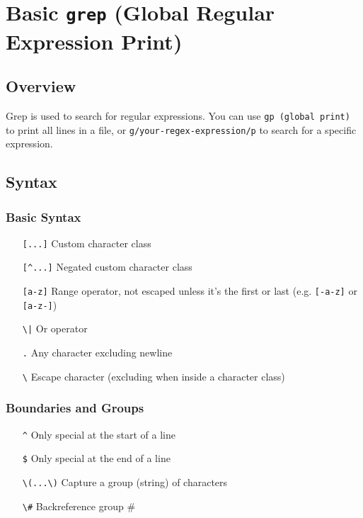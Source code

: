 \documentclass[13pt]{article}
\begin{document}
\section{Basic \texttt{grep} (Global Regular Expression Print)}
\subsection{Overview}
Grep is used to search for regular expressions. You can use \texttt{gp (global print)} to print all lines in a file, or \texttt{g/your-regex-expression/p} to search for a specific expression.
\subsection{Syntax}
\subsubsection{Basic Syntax}
\begin{itemize}[label=]
\item [\texttt{[...]}] Custom character class
\item [\texttt{[\^}\texttt{...]}] Negated custom character class
\item [\texttt{[a-z]}] Range operator, not escaped unless it's the first or last (e.g. \texttt{[-a-z]} or \texttt{[a-z-]})
\item [\texttt{\textbackslash |}] Or operator
\item [\texttt{.}] Any character excluding newline
\item [\texttt{\textbackslash}] Escape character (excluding when inside a character class)
\end{itemize}

\subsubsection{Boundaries and Groups}
\begin{itemize}[label=]
\item [\texttt{\^}] Only special at the start of a line
\item [\texttt{\$}] Only special at the end of a line
\item [\texttt{\textbackslash(...\textbackslash)}] Capture a group (string) of characters
\item [\texttt{\textbackslash\#}] Backreference group \#
\end{itemize}
\end{document}
